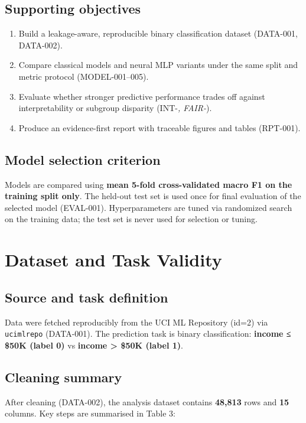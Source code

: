 ﻿\documentclass[11pt,a4paper]{article}
\begin{document}
\subsection{Supporting objectives}

\begin{enumerate}
  \item Build a leakage-aware, reproducible binary classification dataset (DATA-001, DATA-002).
  \item Compare classical models and neural MLP variants under the same split and metric protocol (MODEL-001–005).
  \item Evaluate whether stronger predictive performance trades off against interpretability or subgroup disparity (INT-\textit{, FAIR-}).
  \item Produce an evidence-first report with traceable figures and tables (RPT-001).
\end{enumerate}

\subsection{Model selection criterion}

Models are compared using \textbf{mean 5-fold cross-validated macro F1 on the training split only}. The held-out test set is used once for final evaluation of the selected model (EVAL-001). Hyperparameters are tuned via randomized search on the training data; the test set is never used for selection or tuning.


\section{Dataset and Task Validity}

\subsection{Source and task definition}

Data were fetched reproducibly from the UCI ML Repository (id=2) via \texttt{ucimlrepo} (DATA-001). The prediction task is binary classification: \textbf{income ≤ \$50K (label 0)} vs \textbf{income > \$50K (label 1)}.

\subsection{Cleaning summary}

After cleaning (DATA-002), the analysis dataset contains \textbf{48,813} rows and \textbf{15} columns. Key steps are summarised in Table 3:
\end{document}
